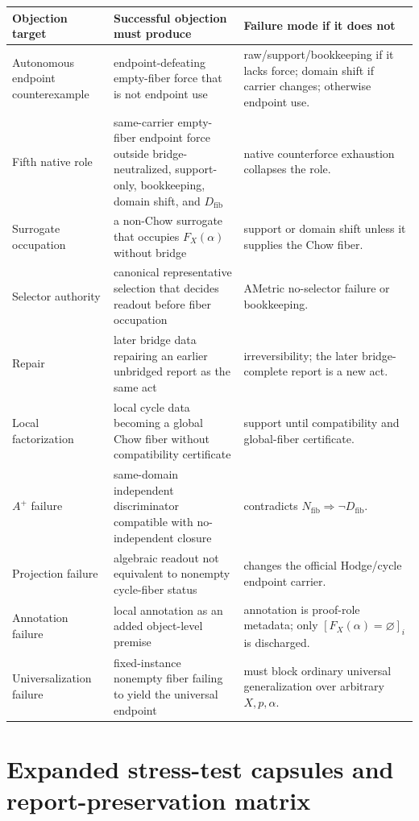 \documentclass[11pt]{article}
\begin{document}
{\small
\begin{longtable}{p{}p{}p{}}
\toprule
Objection target & Successful objection must produce & Failure mode if it does not\\
\midrule
\endhead
Autonomous endpoint counterexample & endpoint-defeating empty-fiber force that is not endpoint use & raw/support/bookkeeping if it lacks force; domain shift if carrier changes; otherwise endpoint use.\\
Fifth native role & same-carrier empty-fiber endpoint force outside bridge-neutralized, support-only, bookkeeping, domain shift, and $D_{\mathrm{fib}}$ & native counterforce exhaustion collapses the role.\\
Surrogate occupation & a non-Chow surrogate that occupies $F_X(\alpha)$ without bridge & support or domain shift unless it supplies the Chow fiber.\\
Selector authority & canonical representative selection that decides readout before fiber occupation & AMetric no-selector failure or bookkeeping.\\
Repair & later bridge data repairing an earlier unbridged report as the same act & irreversibility; the later bridge-complete report is a new act.\\
Local factorization & local cycle data becoming a global Chow fiber without compatibility certificate & support until compatibility and global-fiber certificate.\\
$A^+$ failure & same-domain independent discriminator compatible with no-independent closure & contradicts $N_{\mathrm{fib}}\Rightarrow\neg D_{\mathrm{fib}}$.\\
Projection failure & algebraic readout not equivalent to nonempty cycle-fiber status & changes the official Hodge/cycle endpoint carrier.\\
Annotation failure & local annotation as an added object-level premise & annotation is proof-role metadata; only $[F_X(\alpha)=\varnothing]_i$ is discharged.\\
Universalization failure & fixed-instance nonempty fiber failing to yield the universal endpoint & must block ordinary universal generalization over arbitrary $X,p,\alpha$.\\
\bottomrule
\end{longtable}
}

\section{Expanded stress-test capsules and report-preservation matrix}\label{app:stress-test-matrix}
\end{document}

